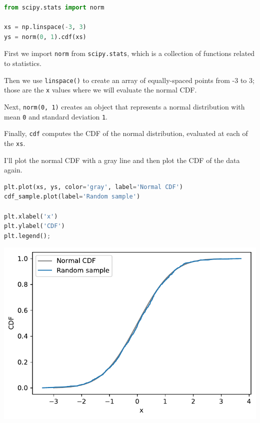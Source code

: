 \begin{lstlisting}[language=Python]
from scipy.stats import norm

xs = np.linspace(-3, 3)
ys = norm(0, 1).cdf(xs)
\end{lstlisting}

First we import \passthrough{\lstinline!norm!} from
\passthrough{\lstinline!scipy.stats!}, which is a collection of
functions related to statistics.

Then we use \passthrough{\lstinline!linspace()!} to create an array of
equally-spaced points from -3 to 3; those are the
\passthrough{\lstinline!x!} values where we will evaluate the normal
CDF.

Next, \passthrough{\lstinline!norm(0, 1)!} creates an object that
represents a normal distribution with mean \passthrough{\lstinline!0!}
and standard deviation \passthrough{\lstinline!1!}.

Finally, \passthrough{\lstinline!cdf!} computes the CDF of the normal
distribution, evaluated at each of the \passthrough{\lstinline!xs!}.

I'll plot the normal CDF with a gray line and then plot the CDF of the
data again.

\begin{lstlisting}[language=Python]
plt.plot(xs, ys, color='gray', label='Normal CDF')
cdf_sample.plot(label='Random sample')

plt.xlabel('x')
plt.ylabel('CDF')
plt.legend();
\end{lstlisting}

\begin{center}
\includegraphics[scale=0.75]{chapters/08_distributions_files/08_distributions_116_0.pdf}
\end{center}

